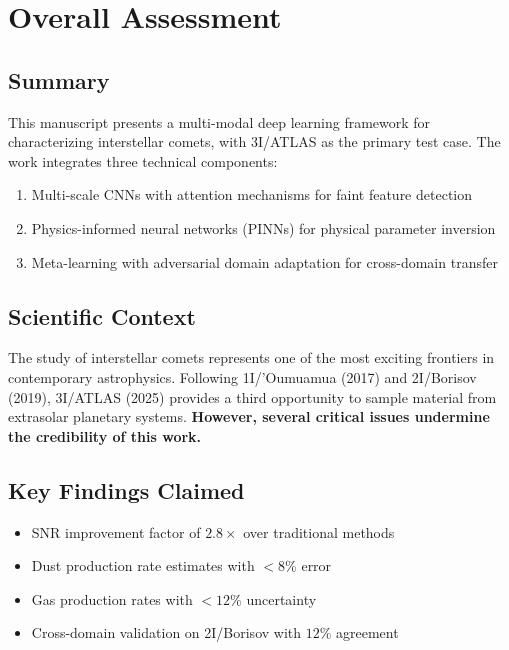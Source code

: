 \documentclass[12pt,a4paper]{article}
\newcommand{\warning}[1]{\textcolor{WarningOrange}{\textbf{#1}}}
\begin{document}
\tableofcontents
\newpage

\section{Overall Assessment}

\subsection{Summary}

This manuscript presents a multi-modal deep learning framework for characterizing interstellar comets, with 3I/ATLAS as the primary test case. The work integrates three technical components:

\begin{enumerate}
    \item Multi-scale CNNs with attention mechanisms for faint feature detection
    \item Physics-informed neural networks (PINNs) for physical parameter inversion
    \item Meta-learning with adversarial domain adaptation for cross-domain transfer
\end{enumerate}

\subsection{Scientific Context}

The study of interstellar comets represents one of the most exciting frontiers in contemporary astrophysics. Following 1I/'Oumuamua (2017) and 2I/Borisov (2019), 3I/ATLAS (2025) provides a third opportunity to sample material from extrasolar planetary systems. \warning{However, several critical issues undermine the credibility of this work.}

\subsection{Key Findings Claimed}

\begin{itemize}
    \item SNR improvement factor of $2.8\times$ over traditional methods
    \item Dust production rate estimates with $<8\%$ error
    \item Gas production rates with $<12\%$ uncertainty
    \item Cross-domain validation on 2I/Borisov with $12\%$ agreement
\end{itemize}
\end{document}
